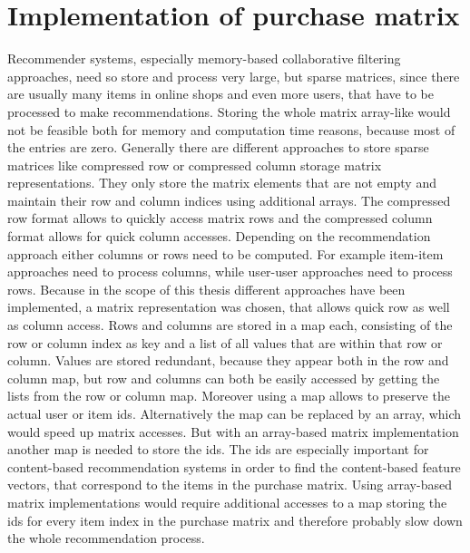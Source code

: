 \documentclass[10pt]{reportMaster}
\begin{document}
\section{Implementation of purchase matrix}
\label{sec:ImplementationOfPurchaseMatrix}
Recommender systems, especially memory-based collaborative filtering approaches, need so store and process very large, but sparse matrices, since there are usually many items in online shops and even more users, that have to be processed to make recommendations.
Storing the whole matrix array-like would not be feasible both for memory and computation time reasons, because most of the entries are zero.
Generally there are different approaches to store sparse matrices like compressed row or compressed column storage matrix representations.
They only store the matrix elements that are not empty and maintain their row and column indices using additional arrays.
The compressed row format allows to quickly access matrix rows and the compressed column format allows for quick column accesses.
Depending on the recommendation approach either columns or rows need to be computed.
For example item-item approaches need to process columns, while user-user approaches need to process rows.
Because in the scope of this thesis different approaches have been implemented, a matrix representation was chosen, that allows quick row as well as column access.
Rows and columns are stored in a map each, consisting of the row or column index as key and a list of all values that are within that row or column.
Values are stored redundant, because they appear both in the row and column map, but row and columns can both be easily accessed by getting the lists from the row or column map.
Moreover using a map allows to preserve the actual user or item ids.
Alternatively the map can be replaced by an array, which would speed up matrix accesses.
But with an array-based matrix implementation another map is needed to store the ids.
The ids are especially important for content-based recommendation systems in order to find the content-based feature vectors, that correspond to the items in the purchase matrix.
Using array-based matrix implementations would require additional accesses to a map storing the ids for every item index in the purchase matrix and therefore probably slow down the whole recommendation process.
\end{document}
